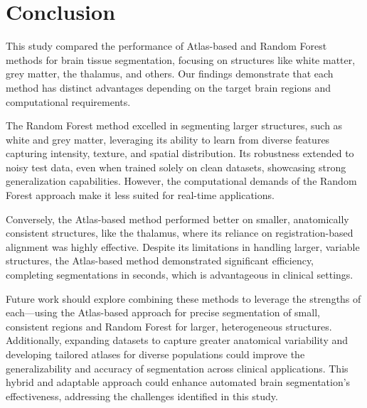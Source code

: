 \section{Conclusion}

This study compared the performance of Atlas-based and Random Forest methods for brain tissue segmentation, focusing on structures like white matter, grey matter, the thalamus, and others. Our findings demonstrate that each method has distinct advantages depending on the target brain regions and computational requirements.

The Random Forest method excelled in segmenting larger structures, such as white and grey matter, leveraging its ability to learn from diverse features capturing intensity, texture, and spatial distribution. Its robustness extended to noisy test data, even when trained solely on clean datasets, showcasing strong generalization capabilities. However, the computational demands of the Random Forest approach make it less suited for real-time applications.

Conversely, the Atlas-based method performed better on smaller, anatomically consistent structures, like the thalamus, where its reliance on registration-based alignment was highly effective. Despite its limitations in handling larger, variable structures, the Atlas-based method demonstrated significant efficiency, completing segmentations in seconds, which is advantageous in clinical settings.

Future work should explore combining these methods to leverage the strengths of each—using the Atlas-based approach for precise segmentation of small, consistent regions and Random Forest for larger, heterogeneous structures. Additionally, expanding datasets to capture greater anatomical variability and developing tailored atlases for diverse populations could improve the generalizability and accuracy of segmentation across clinical applications. This hybrid and adaptable approach could enhance automated brain segmentation's effectiveness, addressing the challenges identified in this study.
